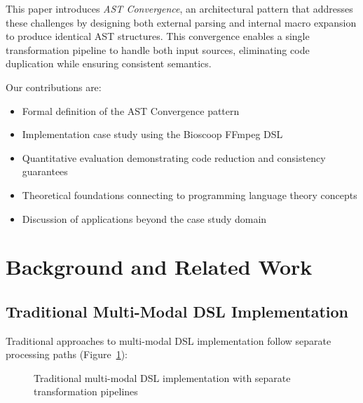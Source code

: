 \documentclass[conference]{IEEEtran}
\begin{document}
This paper introduces \emph{AST Convergence}, an architectural pattern that addresses these challenges by designing both external parsing and internal macro expansion to produce identical AST structures. This convergence enables a single transformation pipeline to handle both input sources, eliminating code duplication while ensuring consistent semantics.

Our contributions are:
\begin{itemize}
\item Formal definition of the AST Convergence pattern
\item Implementation case study using the Bioscoop FFmpeg DSL
\item Quantitative evaluation demonstrating code reduction and consistency guarantees
\item Theoretical foundations connecting to programming language theory concepts
\item Discussion of applications beyond the case study domain
\end{itemize}

\section{Background and Related Work}

\subsection{Traditional Multi-Modal DSL Implementation}

Traditional approaches to multi-modal DSL implementation follow separate processing paths (Figure~\ref{fig:traditional}):

\begin{figure}[htbp]
\centering
{}
\caption{Traditional multi-modal DSL implementation with separate transformation pipelines}
\label{fig:traditional}
\end{figure}
\end{document}
